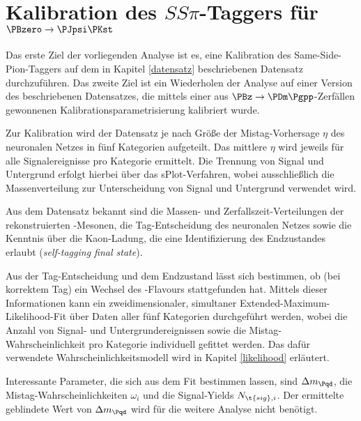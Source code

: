 
\section{\texorpdfstring{Kalibration des $SS\pi$-Taggers für $\PBzero \to \PJpsi \PKst$}{Kalibration des SSpi-Taggers für B0 -> JpsiKst}}

Das erste Ziel der vorliegenden Analyse ist es, eine Kalibration des Same-Side-Pion-Taggers auf dem in Kapitel \ref{datensatz} beschriebenen Datensatz durchzuführen.
Das zweite Ziel ist ein Wiederholen der Analyse auf einer Version des beschriebenen Datensatzes, die mittels einer aus $\PBz \to \PDm\Pgpp$-Zerfällen gewonnenen Kalibrationsparametrisierung kalibriert wurde.


Zur Kalibration wird der Datensatz je nach Größe der Mistag-Vorhersage $η$ des neuronalen Netzes in fünf Kategorien aufgeteilt.
Das mittlere $η$ wird jeweils für alle Signalereignisse pro Kategorie ermittelt.
Die Trennung von Signal und Untergrund erfolgt hierbei über das sPlot-Verfahren\cite{splot}, wobei ausschließlich die Massenverteilung zur Unterscheidung von Signal und Untergrund verwendet wird.

Aus dem Datensatz bekannt sind die Massen- und Zerfallszeit-Verteilungen der rekonstruierten \PB-Mesonen, die Tag-Entscheidung des neuronalen Netzes sowie die Kenntnis über die Kaon-Ladung, die eine Identifizierung des Endzustandes erlaubt (\emph{self-tagging final state}).


Aus der Tag-Entscheidung und dem Endzustand lässt sich bestimmen, ob (bei korrektem Tag) ein Wechsel des \Pqb-Flavours stattgefunden hat.
Mittels dieser Informationen kann ein zweidimensionaler, simultaner Extended-Maximum-Likelihood-Fit über Daten aller fünf Kategorien durchgeführt werden, wobei die Anzahl von Signal- und Untergrundereignissen sowie die Mistag-Wahrscheinlichkeit pro Kategorie individuell gefittet werden.
Das dafür verwendete Wahrscheinlichkeitsmodell wird in Kapitel \ref{likelihood} erläutert.

Interessante Parameter, die sich aus dem Fit bestimmen lassen, sind $\difference{m_{\Pqd}}$, die Mistag-Wahrscheinlichkeiten $ω_i$ und die Signal-Yields $N_{\t{sig},i}$.
Der ermittelte geblindete Wert von $\difference{m_{\Pqd}}$ wird für die weitere Analyse nicht benötigt.

